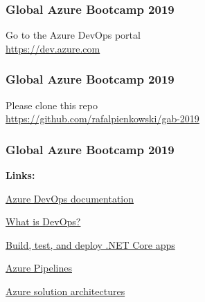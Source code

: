 \documentclass{beamer}
\def \prestitle {Global Azure Bootcamp 2019}
\begin{document}
\begin{frame}
\frametitle{\prestitle}
{\LARGE Go to the Azure DevOps portal}	\\
\vspace{5mm}
{\LARGE \href{https://dev.azure.com}{https://dev.azure.com}}
\end{frame}

\begin{frame}
\frametitle{\prestitle}
{\LARGE Please clone this repo}	\\
\vspace{5mm}
{\LARGE \href{https://github.com/rafalpienkowski/gab-2019}{https://github.com/rafalpienkowski/gab-2019}}
\end{frame}


\begin{frame}
\frametitle{\prestitle}

\begin{flushleft}
	\textbf{{\LARGE Links:}}	
\end{flushleft}

\begin{dinglist}{52}
	\item \href{https://docs.microsoft.com/en-us/azure/devops/?view=azure-devops}{Azure DevOps documentation}
	\item \href{https://www.atlassian.com/devops}{What is DevOps?}
	\item \href{https://docs.microsoft.com/en-us/azure/devops/pipelines/languages/dotnet-core?view=azure-devops}{Build, test, and deploy .NET Core apps}
	\item \href{https://docs.microsoft.com/en-us/azure/devops/pipelines/tasks/test/app-center-test?view=azure-devops}{Azure Pipelines}
	\item \href{https://azure.microsoft.com/en-us/solutions/architecture/?solution=devops}{Azure solution architectures}
\end{dinglist}

\end{frame}
\end{document}
